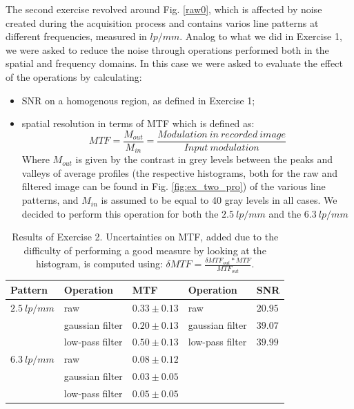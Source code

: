 \documentclass[a4paper]{article}
\begin{document}
The second exercise revolved around Fig. \ref{raw0}, which is affected by noise created during the acquisition process and contains varios line patterns at different frequencies, measured in $lp/ mm$. Analog to what we did in Exercise 1, we were asked to reduce the noise through operations performed both in the spatial and frequency domains. In this case we were asked to evaluate the effect of the operations by calculating:
\begin{itemize}
\item SNR on a homogenous region, as defined in Exercise 1;
\item spatial resolution in terms of MTF which is defined as:
\begin{equation}
MTF=\frac{M_{out}}{M_{in}}=\frac{Modulation\ in\ recorded\ image}{Input\ modulation}
\end{equation}
Where $M_{out}$ is given by the contrast in grey levels between the peaks and valleys of average profiles (the respective histograms, both for the raw and filtered image can be found in Fig. \ref{fig:ex_two_pro}) of the various line patterns, and $M_{in}$ is assumed to be equal to 40 gray levels in all cases. We decided to perform this operation for both the $2.5\ lp/mm$ and the
$6.3\ lp/mm$
\end{itemize}

\begin{table}[!htb]
	\centering
	\begin{tabular}{| l | l | l || l | l |}
		\hline
		Pattern      & Operation       & MTF           & Operation       & SNR \\ \hline
    $2.5\ lp/mm$ & raw             & $0.33 \pm 0.13$ & raw             & $20.95$ \\ \hline
                 & gaussian filter & $0.20 \pm 0.13$ & gaussian filter & $39.07$ \\ \hline
                 & low-pass filter & $0.50 \pm 0.13$ & low-pass filter & $39.99$ \\ \hline
    $6.3\ lp/mm$ & raw             & $0.08 \pm 0.12$ &                 & \\ \hline
                 & gaussian filter & $0.03 \pm 0.05$ &                 & \\ \hline
                 & low-pass filter & $0.05 \pm 0.05$ &                 & \\ \hline
	\end{tabular}
  \caption{Results of Exercise 2. Uncertainties on MTF, added due to the difficulty of performing a good measure by looking at the histogram, is computed using: $\delta MTF = \frac{\delta MTF_{out}*MTF}{MTF_{out}}$.}
  \label{tab:ex_two}
\end{table}
\end{document}
